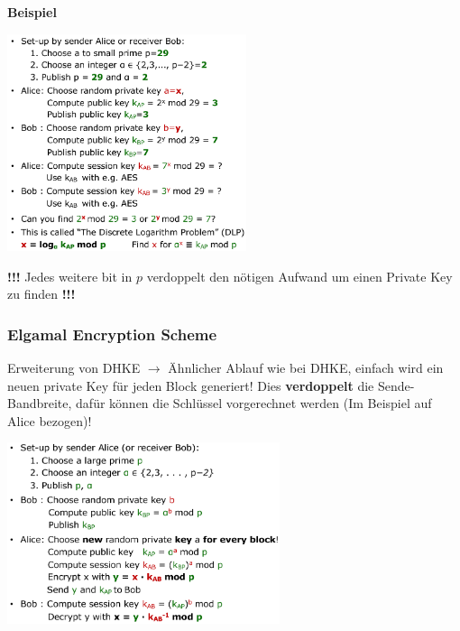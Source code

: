 \documentclass[
  10pt,
  a4paper,
]{article}
\begin{document}
\begin{multicols*}{2}
\begin{tcolorbox}[enhanced jigsaw, rightrule=.15mm, colback=white, colframe=quarto-callout-tip-color-frame, breakable, leftrule=.75mm, bottomrule=.15mm, toprule=.15mm, arc=.35mm, opacityback=0, left=2mm]
\begin{minipage}[t]{5.5mm}
\textcolor{quarto-callout-tip-color}{\faLightbulb}
\end{minipage}%
\begin{minipage}[t]{\textwidth - 5.5mm}

\vspace{-3mm}\textbf{Beispiel}\vspace{3mm}

\begin{center}
\includegraphics[width=7cm,height=\textheight]{images/crypto/image-20.png}
\end{center}

\textbf{!!!} Jedes weitere bit in \(p\) verdoppelt den nötigen Aufwand
um einen Private Key zu finden \textbf{!!!}

\end{minipage}%
\end{tcolorbox}

\subsubsection{Elgamal Encryption
Scheme}\label{elgamal-encryption-scheme}

Erweiterung von DHKE \(\rightarrow\) Ähnlicher Ablauf wie bei DHKE,
einfach wird ein neuen private Key für jeden Block generiert! Dies
\textbf{verdoppelt} die Sende-Bandbreite, dafür können die Schlüssel
vorgerechnet werden (Im Beispiel auf Alice bezogen)!

\begin{center}
\includegraphics[width=8cm,height=\textheight]{images/crypto/image-21.png}
\end{center}


\end{multicols*}
\end{document}
